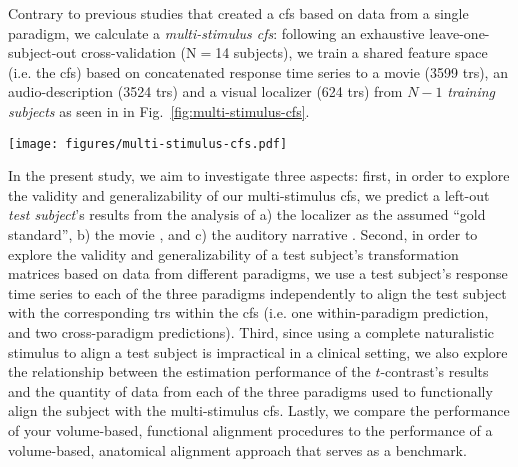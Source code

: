 Contrary to previous studies \citep[e.g.][]{jiahui2020predicting,
guntupalli2016model, haxby2011common} that created a \ac{cfs} based on data from
a single paradigm, we calculate a \textit{multi-stimulus \ac{cfs}}:
following an exhaustive leave-one-subject-out cross-validation (N$=$14
subjects), we train a shared feature space (i.e. the \ac{cfs}) based on
concatenated response time series to a movie (3599 \acp{tr}), an
audio-description (3524 \acp{tr}) and a visual localizer (624 \acp{tr}) from
$N-1$ \textit{training subjects} as seen in in
Fig.~\ref{fig:multi-stimulus-cfs}.


\begin{figure*}[tbp]
\centering
    \texttt{[image: figures/multi-stimulus-cfs.pdf]}
    \caption{
    \textbf{Overview of the shared response model.
    }
    For each fold of the leave-one-subject-out cross-validation, each training
    subject's response time series from the movie (3599 \acp{tr}), the movie's
    audio-description (3524 \acp{tr}), and the visual localizer (624 \acp{tr})
    were concatenated to serve as input for the \ac{srm} algorithm.
    From these response time series represented as matrix $X_{n}$ ({$v$} voxels
    by $t$ time points), the algorithm then calculates the common functional
    space (CFS) $C$ ($k$ shared features by $t$ time points) and subject-specific, transformation matrices $W_{n}$ ($v$
    voxels by $k$ shared features) with orthonormal columns
    ($W_{n}^{T}W_{n}=I_{k}$).
} \label{fig:multi-stimulus-cfs} \end{figure*}


In the present study, we aim to investigate three aspects:
first, in order to explore the validity and generalizability of our
multi-stimulus \ac{cfs}, we predict a left-out \textit{test subject}'s results
from the analysis of
%
a) the localizer \citep{sengupta2016extension} as the assumed ``gold standard'',
%
b) the movie \citep{haeusler2022processing}, and
%
c) the auditory narrative \citep{haeusler2022processing}.
Second, in order to explore the validity and generalizability of a test
subject's transformation matrices based on data from different paradigms, we use
a test subject's response time series to each of the three paradigms
independently to align the test subject with the corresponding \acp{tr} within
the \ac{cfs} (i.e. one within-paradigm prediction, and two cross-paradigm
predictions).
Third, since using a complete naturalistic stimulus to align a test subject is
impractical in a clinical setting, we also explore the relationship between the
estimation performance of the $t$-contrast's results and the quantity of data
from each of the three paradigms used to functionally align the subject with the
multi-stimulus \ac{cfs}.
Lastly, we compare the performance of your volume-based, functional alignment
procedures to the performance of a volume-based, anatomical alignment approach
that serves as a benchmark.



